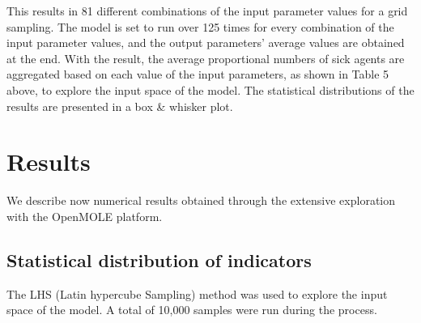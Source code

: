 \documentclass[smallextended]{svjour3}       %
\begin{document}
        
        This results in 81 different combinations of the input parameter values for a grid sampling. The model is set to run over 125 times for every combination of the input parameter values, and the output parameters’ average values are obtained at the end.
With the result, the average proportional numbers of sick agents are aggregated based on each value of the input parameters, as shown in Table 5 above, to explore the input space of the model. The statistical distributions of the results are presented in a box \& whisker plot.






\section{Results}


We describe now numerical results obtained through the extensive exploration with the OpenMOLE platform.


\subsection{Statistical distribution of indicators}

The LHS (Latin hypercube Sampling) method was used to explore the input space of the model. A total of 10,000 samples were run during the process.
\end{document}
